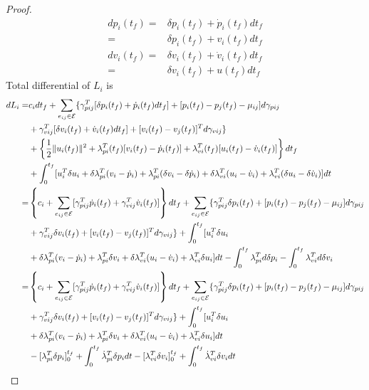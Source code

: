 \documentclass[12pt,draftcls,onecolumn]{IEEEtran}  %
\begin{document}
{\begin{proof}
\begin{align*}
dp_i(t_f)=&\delta p_i(t_f)+\dot{p}_i(t_f)d t_f\\
=&\delta p_i(t_f)+v_i(t_f)d t_f\\
dv_i(t_f)=&\delta v_i(t_f)+\dot{v}_i(t_f)d t_f\\
=&\delta v_i(t_f)+u(t_f)d t_f
\end{align*}
Total differential of $L_i$ is
\begin{align}
d L_i=&c_i d t_f+\sum_{e_{ij}\in\mathcal{E}}\{ \gamma^T_{pij}
[\delta p_i(t_f)+\dot{p}_i(t_f)dt_f]+[ p_i(t_f)-p_j(t_f)-\mu_{ij}]d\gamma_{pij}\notag\\
&+\gamma^T_{vij}[\delta v_i(t_f)+\dot{v}_i(t_f)d t_f]+[ v_i(t_f)-v_j(t_f)]^Td\gamma_{vij}\}\notag\\
&+\left\{\frac{1}{2}\|u_i(t_f)\|^2+ \lambda_{pi}^T(t_f)[v_i(t_f)-\dot{p}_i(t_f)]+
\lambda_{vi}^T(t_f)[u_i(t_f)-\dot{v}_i(t_f)]\right\}dt_f\notag\\
&+\int_0^{t_f} [u_i^T\delta u_i + \delta \lambda_{pi}^T(v_i-\dot{p}_i)+ \lambda_{pi}^T(\delta v_i-\delta \dot{p}_i)
+\delta \lambda_{vi}^T(u_i-\dot{v}_i) + \lambda_{vi}^T(\delta u_i-\delta \dot{v}_i)]\mbox{d}t\notag\\
=&\left\{c_i+\sum_{e_{ij}\in\mathcal{E}} [\gamma^T_{pij} \dot{p}_i(t_f)+\gamma^T_{vij} \dot{v}_i(t_f)]\right\}dt_f+\sum_{e_{ij}\in\mathcal{E}}\{\gamma^T_{pij}
\delta p_i(t_f)+[ p_i(t_f)-p_j(t_f)-\mu_{ij}]d\gamma_{pij}\notag\\
&+\gamma^T_{vij}\delta v_i(t_f)+[ v_i(t_f)-v_j(t_f)]^Td\gamma_{vij}\}+\int_0^{t_f} [u_i^T\delta u_i \notag\\
&+ \delta \lambda_{pi}^T(v_i-\dot{p}_i)+ \lambda_{pi}^T\delta v_i
+\delta \lambda_{vi}^T(u_i-\dot{v}_i) + \lambda_{vi}^T\delta u_i]\mbox{d}t-\int_{0}^{t_f} \lambda_{pi}^T\mbox{d}\delta p_i -\int_{0}^{t_f} \lambda_{vi}^T\mbox{d}\delta v_i\notag\\
=&\left\{c_i+\sum_{e_{ij}\in\mathcal{E}} [\gamma^T_{pij} \dot{p}_i(t_f)+\gamma^T_{vij} \dot{v}_i(t_f)]\right\}dt_f+\sum_{e_{ij}\in\mathcal{E}}\{\gamma^T_{pij}
\delta p_i(t_f)+[ p_i(t_f)-p_j(t_f)-\mu_{ij}]d\gamma_{pij}\notag\\
&+\gamma^T_{vij}\delta v_i(t_f)+[ v_i(t_f)-v_j(t_f)]^Td\gamma_{vij}\}+\int_0^{t_f} [u_i^T\delta u_i \notag\\
&+ \delta \lambda_{pi}^T(v_i-\dot{p}_i)+ \lambda_{pi}^T\delta v_i
+\delta \lambda_{vi}^T(u_i-\dot{v}_i) + \lambda_{vi}^T\delta u_i]\mbox{d}t\notag\\
&-[ \lambda_{pi}^T\delta p_i]_0^{t_f}+\int_{0}^{t_f} \dot{\lambda}^T_{pi}\delta p_{i}\mbox{d}t  -[\lambda_{vi}^T\delta v_i]_{0}^{t_f}+\int_{0}^{t_f} \dot{\lambda}_{vi}^T\delta v_i\mbox{d}t\notag\\

\end{align}
\end{proof}}
\end{document}
